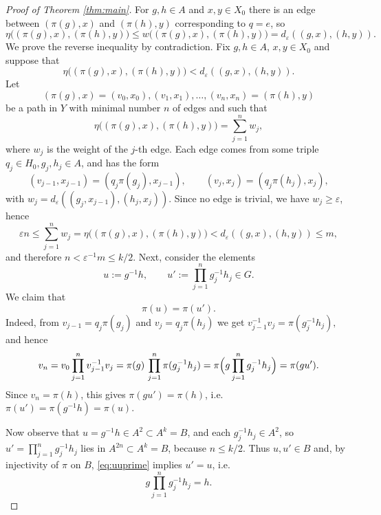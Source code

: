 \documentclass[11pt,a4paper]{amsproc}
\numberwithin{equation}{section}
\theoremstyle{definition}
\begin{document}
\begin{proof}[Proof of Theorem \ref{thm:main}]
For $g,h\in A$ and $x,y\in X_0$ there is an edge between $(\pi(g),x)$ and $(\pi(h),y)$ corresponding to $q=e$, so
\[
\eta\bigl((\pi(g),x),(\pi(h),y)\bigr)
\le w\bigl((\pi(g),x),(\pi(h),y)\bigr)
= d_\varepsilon((g,x),(h,y)).
\]
We prove the reverse inequality by contradiction. Fix $g,h\in A$, $x,y\in X_0$ and suppose that
\begin{equation}\label{eq:contr}
\eta\bigl((\pi(g),x),(\pi(h),y)\bigr)
< d_\varepsilon((g,x),(h,y)).
\end{equation}
Let
\[
(\pi(g),x)=(v_0,x_0), (v_1,x_1),\dots,(v_n,x_n)=(\pi(h),y)
\]
be a path in $Y$ with minimal number $n$ of edges and such that
\[
\eta\bigl((\pi(g),x),(\pi(h),y)\bigr)
= \sum_{j=1}^n w_j,
\]
where $w_j$ is the weight of the $j$-th edge. Each edge comes from some triple $q_j\in H_0,g_j,h_j\in A$,
and has the form
\[
(v_{j-1},x_{j-1})=(q_j\pi(g_j),x_{j-1}),\qquad
(v_j,x_j)=(q_j\pi(h_j),x_j),
\]
with $w_j = d_\varepsilon((g_j,x_{j-1}),(h_j,x_j))$.
Since no edge is trivial, we have $w_j\ge\varepsilon$, hence
\[
\varepsilon n \le \sum_{j=1}^n w_j
= \eta\bigl((\pi(g),x),(\pi(h),y)\bigr)
< d_\varepsilon((g,x),(h,y))
\le m,
\]
and therefore $n < \varepsilon^{-1}m \le k/2$.
Next, consider the elements
\[
u := g^{-1}h,\qquad
u' := \prod_{j=1}^n g_j^{-1}h_j \in G.
\]
We claim that
\begin{equation}\label{eq:uuprime}
\pi(u) = \pi(u').
\end{equation}
Indeed, from $v_{j-1}=q_j\pi(g_j)$ and $v_j=q_j\pi(h_j)$ we get
$v_{j-1}^{-1}v_j = \pi(g_j^{-1}h_j),$
and hence
\[
v_n
= v_0 \prod_{j=1}^n v_{j-1}^{-1}v_j
= \pi(g)\,\prod_{j=1}^n \pi(g_j^{-1}h_j)
= \pi\Bigl(g \prod_{j=1}^n g_j^{-1}h_j\Bigr)
= \pi(gu').
\]
Since $v_n=\pi(h)$, this gives $\pi(gu')=\pi(h)$, i.e.~$\pi(u')=\pi(g^{-1}h)=\pi(u)$.

Now observe that $u = g^{-1}h \in A^2 \subset A^{k}=B$,
and each $g_j^{-1}h_j\in A^2$, so $u'=\prod_{j=1}^n g_j^{-1}h_j$ lies in $A^{2n}\subset A^{k}=B$, because $n\le k/2$. Thus $u,u'\in B$ and, by injectivity of $\pi$ on $B$, \eqref{eq:uuprime} implies $u'=u$, i.e.
\begin{equation}\label{eq:gprod= h}
g\prod_{j=1}^n g_j^{-1}h_j = h.
\end{equation}


\end{proof}
\end{document}
